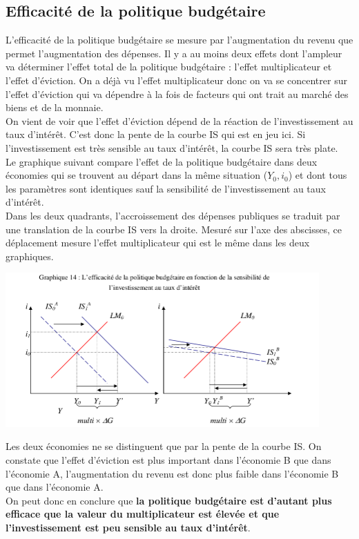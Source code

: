\documentclass[10pt]{book}
\begin{document}
\subsection{Efficacité de la politique budgétaire}
L'efficacité de la politique budgétaire se mesure par l'augmentation du revenu que permet l'augmentation des dépenses. Il y a au moins deux effets dont l'ampleur va déterminer l'effet total de la politique budgétaire : l'effet multiplicateur et l'effet d'éviction. On a déjà vu l'effet multiplicateur donc on va se concentrer sur l'effet d'éviction qui va dépendre à la fois de facteurs qui ont trait au marché des biens et de la monnaie. \\
On vient de voir que l'effet d'éviction dépend de la réaction de l'investissement au taux d'intérêt. C'est donc la pente de la courbe IS qui est en jeu ici. Si l'investissement est très sensible au taux d'intérêt, la courbe IS sera très plate. \\
Le graphique suivant compare l'effet de la politique budgétaire dans deux économies qui se trouvent au départ dans la même situation ($Y_0, i_0$) et dont tous les paramètres sont identiques sauf la sensibilité de l'investissement au taux d'intérêt. \\
Dans les deux quadrants, l'accroissement des dépenses publiques se traduit par une translation de la courbe IS vers la droite. Mesuré sur l'axe des abscisses, ce déplacement mesure l'effet multiplicateur qui est le même dans les deux graphiques.
\begin{center}
  \includegraphics[width=12cm]{graph39.png}
\end{center}
Les deux économies ne se distinguent que par la pente de la courbe IS. On constate que l'effet d'éviction est plus important dans l'économie B que dans l'économie A, l'augmentation du revenu est donc plus faible dans l'économie B que dans l'économie A. \\
On peut donc en conclure que \textbf{la politique budgétaire est d'autant plus efficace que la valeur du multiplicateur est élevée et que l'investissement est peu sensible au taux d'intérêt}. \\
\end{document}
